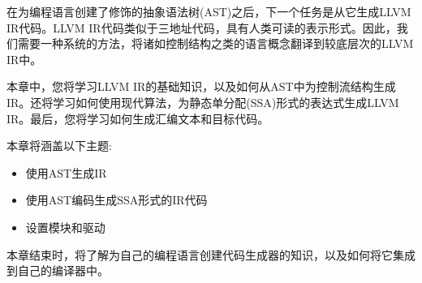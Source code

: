 在为编程语言创建了修饰的抽象语法树(AST)之后，下一个任务是从它生成LLVM IR代码。LLVM IR代码类似于三地址代码，具有人类可读的表示形式。因此，我们需要一种系统的方法，将诸如控制结构之类的语言概念翻译到较底层次的LLVM IR中。\par

本章中，您将学习LLVM IR的基础知识，以及如何从AST中为控制流结构生成IR。还将学习如何使用现代算法，为静态单分配(SSA)形式的表达式生成LLVM IR。最后，您将学习如何生成汇编文本和目标代码。\par

本章将涵盖以下主题:\par

\begin{itemize}
	\item 使用AST生成IR
	\item 使用AST编码生成SSA形式的IR代码
	\item 设置模块和驱动
\end{itemize}

本章结束时，将了解为自己的编程语言创建代码生成器的知识，以及如何将它集成到自己的编译器中。\par















































